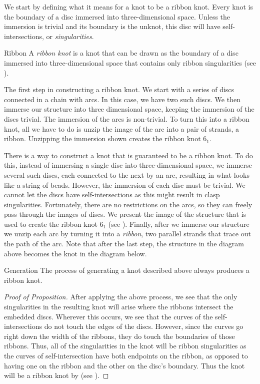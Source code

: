 \begin{paper}
We start by defining what it means for a knot to be a ribbon knot.
Every knot is the boundary of a disc immersed into three-dimensional space.
Unless the immersion is trivial and its boundary is the unknot, this disc will
have self-intersections, or \textit{singularities}.

\begin{paperdef}{Ribbon}
A \textit{ribbon knot} is a knot that can be drawn as the boundary of a disc
immersed into three-dimensional space that contains only ribbon singularities
(see \figSingularities).
\end{paperdef}

{The first step in constructing a ribbon knot.
We start with a series of discs connected in a chain with arcs.
In this case, we have two such discs.
We then immerse our structure into three dimensional space, keeping the
immersion of the discs trivial.
The immersion of the arcs is non-trivial.
To turn this into a ribbon knot, all we have to do is unzip the image of the
arc into a pair of strands, a ribbon.
Unzipping the immersion shown creates the ribbon knot $6_1$.}

There is a way to construct a knot that is guaranteed to be a ribbon knot.
To do this, instead of immersing a single disc into three-dimensional space, we
immerse several such discs, each connected to the next by an arc, resulting in
what looks like a string of beads.
However, the immersion of each disc must be trivial.
We cannot let the discs have self-intersections as this might result in clasp
singularities.
Fortunately, there are no restrictions on the arcs, so they can freely pass
through the images of discs.
We present the image of the structure that is used to create the ribbon knot
$6_1$ (see \figImmersion).
Finally, after we immerse our structure we unzip each arc by turning it into a
\textit{ribbon}, two parallel strands that trace out the path of the arc.
Note that after the last step, the structure in the diagram above becomes the
knot in the diagram below.

\begin{paperprp}{Generation}
The process of generating a knot described above always produces a ribbon knot.
\end{paperprp}
\begin{proof}[Proof of Proposition]
After applying the above process, we see that the only singularities in the
resulting knot will arise where the ribbons intersect the embedded discs.
Wherever this occurs, we see that the curves of the self-intersections do not
touch the edges of the discs.
However, since the curves go right down the width of the ribbons, they do touch
the boundaries of those ribbons.
Thus, all of the singularities in the knot will be ribbon singularities as the
curves of self-intersection have both endpoints on the ribbon, as opposed to
having one on the ribbon and the other on the disc's boundary.
Thus the knot will be a ribbon knot by  (see \figSingularities).
\end{proof}


\end{paper}
